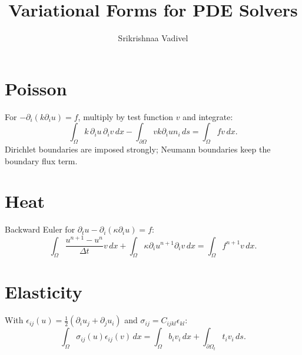 \documentclass{article}
\title{Variational Forms for PDE Solvers}
\author{Srikrishnaa Vadivel}
\date{}
\begin{document}
\maketitle

\section{Poisson}
For $-\partial_i(k\partial_i u)=f$, multiply by test function $v$ and integrate:
\[
  \int_\Omega k\,\partial_i u\,\partial_i v\,dx
  -\int_{\partial\Omega}v k\partial_i u n_i\,ds
  =\int_\Omega f v\,dx.
\]
Dirichlet boundaries are imposed strongly; Neumann boundaries keep the boundary
flux term.

\section{Heat}
Backward Euler for $\partial_t u-\partial_i(\kappa\partial_i u)=f$:
\[
  \int_\Omega \frac{u^{n+1}-u^n}{\Delta t}v\,dx+
  \int_\Omega \kappa\partial_i u^{n+1}\partial_i v\,dx
  =\int_\Omega f^{n+1}v\,dx.
\]

\section{Elasticity}
With $\epsilon_{ij}(u)=\frac12(\partial_i u_j+\partial_j u_i)$ and
$\sigma_{ij}=C_{ijkl}\epsilon_{kl}$:
\[
  \int_\Omega \sigma_{ij}(u)\epsilon_{ij}(v)\,dx=\int_\Omega b_i v_i\,dx+
  \int_{\partial\Omega_t}t_i v_i\,ds.
\]
\end{document}
